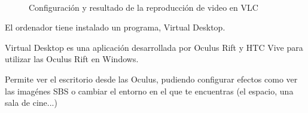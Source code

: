 \documentclass[twoside, 12pt]{epstfg}
\begin{document}
\begin{figure}[width= .80\textwidth]
	\centering
	\\
		\caption{Configuración y resultado de la reproducción de video en VLC} \label{figstream}
\end{figure}

El ordenador tiene instalado un programa, Virtual Desktop.

Virtual Desktop es una aplicación desarrollada por Oculus Rift y  HTC Vive para utilizar las Oculus Rift en Windows.

Permite ver el escritorio desde las Oculus, pudiendo configurar efectos como ver las imagénes SBS o cambiar el entorno en el que te encuentras (el espacio, una sala de cine...)
\end{document}
